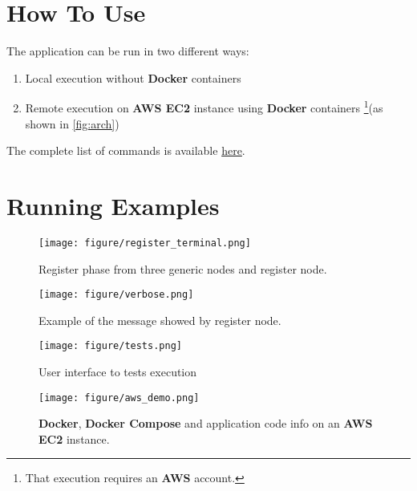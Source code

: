 \documentclass[conference]{IEEEtran}
\begin{document}
\section{How To Use}\label{how}

The application can be run in two different ways:

\begin{enumerate}
    \item Local execution without \textbf{Docker} containers
    \item Remote execution on \textbf{AWS EC2} instance using \textbf{Docker} containers \footnote{That execution requires an \textbf{AWS} account.}(as shown in \ref{fig:arch})
\end{enumerate}

The complete list of commands is available \href{https://github.com/matt-merman/SDCC#running}{here}.

\section{Running Examples}

\begin{figure}[htb]\label{fig:register}
\texttt{[image: figure/register\_terminal.png]}
\caption{Register phase from three generic nodes and register node.}
\end{figure}

\begin{figure}[htb]\label{fig:verbose}
\texttt{[image: figure/verbose.png]}
\caption{Example of the message showed by register node.}
\end{figure}

\begin{figure}[htb]\label{fig:tests}
\texttt{[image: figure/tests.png]}
\caption{User interface to tests execution}
\end{figure}

\begin{figure}[htb]\label{fig:aws}
\texttt{[image: figure/aws\_demo.png]}
\caption{\textbf{Docker}, \textbf{Docker Compose} and application code info on an \textbf{AWS EC2} instance.}
\end{figure}

\printbibliography
\end{document}
